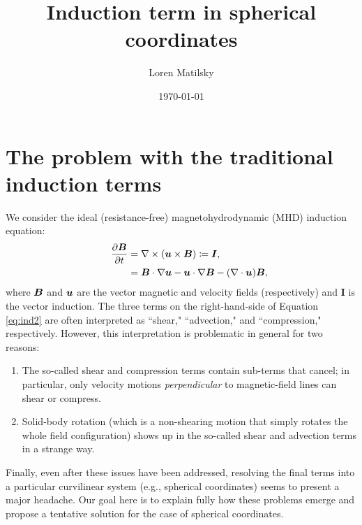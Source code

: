 \documentclass[12pt]{article}
\date{\today}
\author{Loren Matilsky}
\title{Induction term in spherical coordinates}
\newcommand{\veci}{\bm{I}}
\begin{document}
\maketitle

\section{The problem with the traditional induction terms}
We consider the ideal (resistance-free) magnetohydrodynamic (MHD) induction equation:
\begin{align}
	\five\pderiv{\vecb}{t} &= \curl(\vecu\times\vecb) \label{eq:ind1}\define\veci,\\
	&= \vecb\dotgrad\vecu - \vecu\dotgrad\vecb -(\Div\vecu)\vecb, \label{eq:ind2}
\end{align}
where $\bm{B}$ and $\bm{u}$ are the vector magnetic and velocity fields (respectively) and $\veci$ is the vector induction. The three terms on the right-hand-side of Equation \eqref{eq:ind2} are often interpreted as ``shear," ``advection," and ``compression," respectively. However, this interpretation is problematic in general for two reasons:

\begin{enumerate}
	\item The so-called shear and compression terms contain sub-terms that cancel; in particular, only velocity motions \textit{perpendicular} to magnetic-field lines can shear or compress. \label{enum:problem1}
	\item Solid-body rotation (which is a non-shearing motion that simply rotates the whole field configuration) shows up in the so-called shear and advection terms in a strange way. \label{enum:problem2}
\end{enumerate}

Finally, even after these issues have been addressed, resolving the final terms into a particular curvilinear system (e.g., spherical coordinates) seems to present a major headache. Our goal here is to explain fully how these problems emerge and propose a tentative solution for the case of spherical coordinates. 
\end{document}
